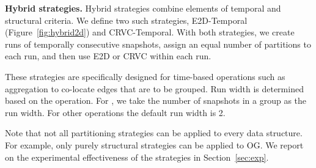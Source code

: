 {\bf Hybrid strategies.} Hybrid strategies combine elements of
temporal and structural criteria.  We define two such strategies,
E2D-Temporal (Figure~\ref{fig:hybrid2d}) and CRVC-Temporal.  With both
strategies, we create runs of temporally consecutive snapshots, assign
an equal number of partitions to each run, and then use E2D or CRVC
within each run.

These strategies are specifically designed for time-based operations
such as aggregation to co-locate edges that are to be grouped.  Run
width is determined based on the operation.  For , we
take the number of snapshots in a group as the run width.  For other
operations the default run width is 2.

Note that not all partitioning strategies can be applied to every data
structure.  For example, only purely structural strategies can be
applied to OG.  We report on the experimental effectiveness of the
strategies in Section~\ref{sec:exp}.


